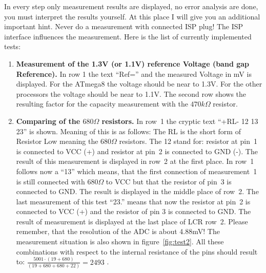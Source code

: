 In every step only measurement results are displayed, no error analysis are done, you must interpret the results yourself.
At this place I will give you an additional important hint. Never do a measurement with connected ISP plug!
The ISP interface influences the measurement. 
\vspace{1cm}
Here is the list of currently implemented tests:
\vspace{1cm}
\begin{enumerate}
\item {\bf Measurement of the 1.3V (or 1.1V) reference Voltage (band gap Reference).}
In row 1 the text ``Ref='' and the measured Voltage in mV is displayed.
For the ATmega8 the voltage should be near to 1.3V. For the other processors the voltage should be near to 1.1V.
The second row shows the resulting factor for the capacity measurement with the \(470k\Omega\) resistor.
\item {\bf Comparing of the  \(680\Omega\) resistors.}
In row~1 the cryptic text  ``+RL- 12 13 23'' is shown. Meaning of this is as follows: 
The RL is the short form of Resistor Low meaning the \(680\Omega\) resistors. The 12 stand for: 
resistor at pin~1 is connected to VCC (+) and resistor at pin~2 is connected to GND (-). 
The result of this measurement  is displayed in row~2 at the first place. 
 In row~1 follows now a ``13'' which means, that the first connection of measurement~1 is still connected
with \(680\Omega\) to VCC but that the resistor of pin~3 is connected to GND.
The result is displayed in the middle place of row~2. 
The last measurement of this test ``23.'' means that now the resistor at pin~2 is connected to VCC (+) and
the resistor of pin 3 is connected to GND. The result of measurement is displayed at the last place of LCR row~2.
Please remember, that the resolution of the ADC is about 4.88mV!
The measurement situation is also shown in figure~\ref{fig:test2}.
All these combinations with respect to the internal resistance of the pins should result to: 
\(\frac{5001 \cdot  (19+680)}{ (19+680+680+22)} = 2493\) .


\end{enumerate}
